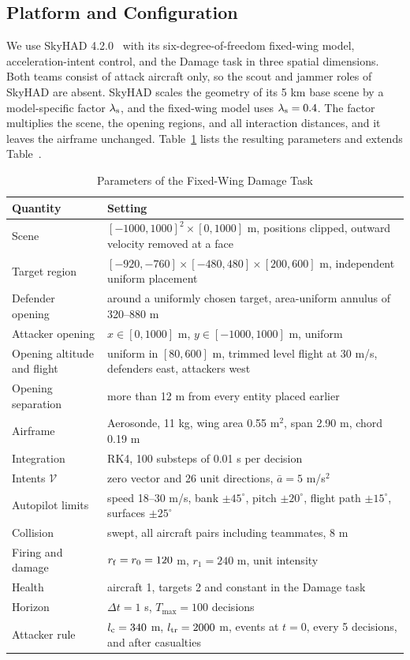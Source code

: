 \subsection{Platform and Configuration}
We use SkyHAD 4.2.0~\cite{skyhad2026} with its six-degree-of-freedom fixed-wing model, acceleration-intent control, and the Damage task in three spatial dimensions. Both teams consist of attack aircraft only, so the scout and jammer roles of SkyHAD are absent. SkyHAD scales the geometry of its 5 km base scene by a model-specific factor $\lambda_{\rm s}$, and the fixed-wing model uses $\lambda_{\rm s}=0.4$. The factor multiplies the scene, the opening regions, and all interaction distances, and it leaves the airframe unchanged. Table~\ref{tab:s-env} lists the resulting parameters and extends Table~.

\begin{table}[!t]
\centering
\scriptsize
\setlength{\tabcolsep}{3pt}
\caption{Parameters of the Fixed-Wing Damage Task}
\label{tab:s-env}
\begin{tabular}{@{}p{}p{}@{}}
\toprule
Quantity & Setting\\
\midrule
Scene & $[-1000,1000]^2\times[0,1000]$ m, positions clipped, outward velocity removed at a face\\
Target region & $[-920,-760]\times[-480,480]\times[200,600]$ m, independent uniform placement\\
Defender opening & around a uniformly chosen target, area-uniform annulus of 320--880 m\\
Attacker opening & $x\in[0,1000]$ m, $y\in[-1000,1000]$ m, uniform\\
Opening altitude and flight & uniform in $[80,600]$ m, trimmed level flight at 30 m/s, defenders east, attackers west\\
Opening separation & more than 12 m from every entity placed earlier\\
Airframe & Aerosonde, 11 kg, wing area 0.55 m$^2$, span 2.90 m, chord 0.19 m\\
Integration & RK4, 100 substeps of 0.01 s per decision\\
Intents $\mathcal V$ & zero vector and 26 unit directions, $\bar a=5$ m/s$^2$\\
Autopilot limits & speed 18--30 m/s, bank $\pm45^\circ$, pitch $\pm20^\circ$, flight path $\pm15^\circ$, surfaces $\pm25^\circ$\\
Collision & swept, all aircraft pairs including teammates, 8 m\\
Firing and damage & $r_{\rm f}=r_0=120$ m, $r_1=240$ m, unit intensity\\
Health & aircraft 1, targets 2 and constant in the Damage task\\
Horizon & $\Delta t=1$ s, $T_{\max}=100$ decisions\\
Attacker rule & $l_{\rm c}=340$ m, $l_{\rm tr}=2000$ m, events at $t=0$, every 5 decisions, and after casualties\\
\bottomrule
\end{tabular}
\end{table}

